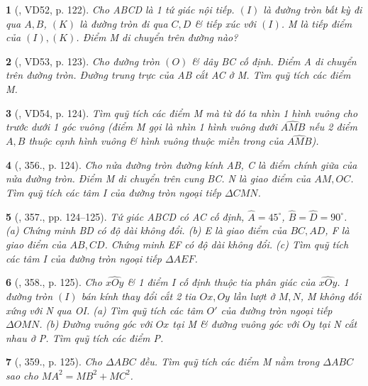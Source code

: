 \documentclass{article}
\newtheorem{baitoan}{}
\begin{document}
\begin{baitoan}[\cite{Binh_Toan_9_tap_2}, VD52, p. 122]
	Cho ABCD là 1 tứ giác nội tiếp. $(I)$ là đường tròn bất kỳ đi qua $A,B$, $(K)$ là đường tròn đi qua $C,D$ \& tiếp xúc với $(I)$. M là tiếp điểm của $(I),(K)$. Điểm M di chuyển trên đường nào?
\end{baitoan}

\begin{baitoan}[\cite{Binh_Toan_9_tap_2}, VD53, p. 123]
	Cho đường tròn $(O)$ \& dây BC cố định. Điểm A di chuyển trên đường tròn. Đường trung trực của AB cắt AC ở M. Tìm quỹ tích các điểm M.
\end{baitoan}

\begin{baitoan}[\cite{Binh_Toan_9_tap_2}, VD54, p. 124]
	Tìm quỹ tích các điểm M mà từ đó ta nhìn 1 hình vuông cho trước dưới 1 góc vuông (điểm M gọi là {\rm nhìn 1 hình vuông dưới $\widehat{AMB}$} nếu 2 điểm $A,B$ thuộc cạnh hình vuông \& hình vuông thuộc miền trong của $\widehat{AMB}$).
\end{baitoan}

\begin{baitoan}[\cite{Binh_Toan_9_tap_2}, 356., p. 124]
	Cho nửa đường tròn đường kính AB, C là điểm chính giữa của nửa đường tròn. Điểm M di chuyển trên cung BC. N là giao điểm của $AM,OC$. Tìm quỹ tích các tâm I của đường tròn ngoại tiếp $\Delta CMN$.
\end{baitoan}

\begin{baitoan}[\cite{Binh_Toan_9_tap_2}, 357., pp. 124--125]
	Tứ giác ABCD có AC cố định, $\widehat{A} = 45^\circ$, $\widehat{B} = \widehat{D} = 90^\circ$. (a) Chứng minh BD có độ dài không đổi. (b) E là giao điểm của $BC,AD$, F là giao điểm của $AB,CD$. Chứng minh EF có độ dài không đổi. (c) Tìm quỹ tích các tâm I của đường tròn ngoại tiếp $\Delta AEF$.
\end{baitoan}

\begin{baitoan}[\cite{Binh_Toan_9_tap_2}, 358., p. 125]
	Cho $\widehat{xOy}$ \& 1 điểm I cố định thuộc tia phân giác của $\widehat{xOy}$. 1 đường tròn $(I)$ bán kính thay đổi cắt 2 tia $Ox,Oy$ lần lượt ở $M,N$, M không đối xứng với N qua OI. (a) Tìm quỹ tích các tâm $O'$ của đường tròn ngoại tiếp $\Delta OMN$. (b) Đường vuông góc với $Ox$ tại M \& đường vuông góc với $Oy$ tại N cắt nhau ở P. Tìm quỹ tích các điểm P.
\end{baitoan}

\begin{baitoan}[\cite{Binh_Toan_9_tap_2}, 359., p. 125]
	Cho $\Delta ABC$ đều. Tìm quỹ tích các điểm M nằm trong $\Delta ABC$ sao cho $MA^2 = MB^2 + MC^2$.
\end{baitoan}
\end{document}
